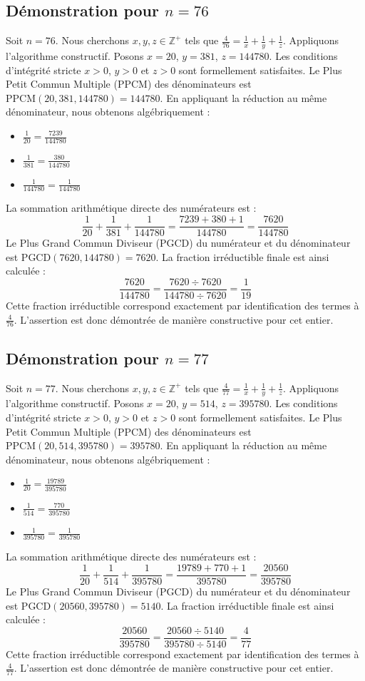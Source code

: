 \documentclass[11pt,a4paper]{article}
\begin{document}
\subsection{Démonstration pour $n = 76$}
Soit $n = 76$. Nous cherchons $x, y, z \in \mathbb{Z}^{+}$ tels que $\frac{4}{76} = \frac{1}{x} + \frac{1}{y} + \frac{1}{z}$.
Appliquons l'algorithme constructif. Posons $x = 20$, $y = 381$, $z = 144780$.
Les conditions d'intégrité stricte $x > 0$, $y > 0$ et $z > 0$ sont formellement satisfaites.
Le Plus Petit Commun Multiple (PPCM) des dénominateurs est $\text{PPCM}(20, 381, 144780) = 144780$.
En appliquant la réduction au même dénominateur, nous obtenons algébriquement :
\begin{itemize}
    \item $\frac{1}{20} = \frac{7239}{144780}$
    \item $\frac{1}{381} = \frac{380}{144780}$
    \item $\frac{1}{144780} = \frac{1}{144780}$
\end{itemize}
La sommation arithmétique directe des numérateurs est :
$$ \frac{1}{20} + \frac{1}{381} + \frac{1}{144780} = \frac{7239 + 380 + 1}{144780} = \frac{7620}{144780} $$
Le Plus Grand Commun Diviseur (PGCD) du numérateur et du dénominateur est $\text{PGCD}(7620, 144780) = 7620$.
La fraction irréductible finale est ainsi calculée :
$$ \frac{7620}{144780} = \frac{7620 \div 7620}{144780 \div 7620} = \frac{1}{19} $$
Cette fraction irréductible correspond exactement par identification des termes à $\frac{4}{76}$. L'assertion est donc démontrée de manière constructive pour cet entier.

\subsection{Démonstration pour $n = 77$}
Soit $n = 77$. Nous cherchons $x, y, z \in \mathbb{Z}^{+}$ tels que $\frac{4}{77} = \frac{1}{x} + \frac{1}{y} + \frac{1}{z}$.
Appliquons l'algorithme constructif. Posons $x = 20$, $y = 514$, $z = 395780$.
Les conditions d'intégrité stricte $x > 0$, $y > 0$ et $z > 0$ sont formellement satisfaites.
Le Plus Petit Commun Multiple (PPCM) des dénominateurs est $\text{PPCM}(20, 514, 395780) = 395780$.
En appliquant la réduction au même dénominateur, nous obtenons algébriquement :
\begin{itemize}
    \item $\frac{1}{20} = \frac{19789}{395780}$
    \item $\frac{1}{514} = \frac{770}{395780}$
    \item $\frac{1}{395780} = \frac{1}{395780}$
\end{itemize}
La sommation arithmétique directe des numérateurs est :
$$ \frac{1}{20} + \frac{1}{514} + \frac{1}{395780} = \frac{19789 + 770 + 1}{395780} = \frac{20560}{395780} $$
Le Plus Grand Commun Diviseur (PGCD) du numérateur et du dénominateur est $\text{PGCD}(20560, 395780) = 5140$.
La fraction irréductible finale est ainsi calculée :
$$ \frac{20560}{395780} = \frac{20560 \div 5140}{395780 \div 5140} = \frac{4}{77} $$
Cette fraction irréductible correspond exactement par identification des termes à $\frac{4}{77}$. L'assertion est donc démontrée de manière constructive pour cet entier.
\end{document}
